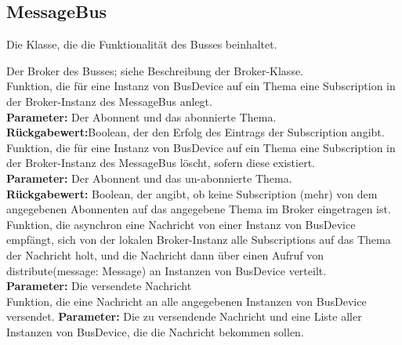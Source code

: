 \documentclass[entwurf.tex]{subfiles}
\begin{document}
	\subsection{MessageBus}
	\label{Class:MessageBus}
		Die Klasse, die die Funktionalität des Busses beinhaltet.
		\begin{description}
				Der Broker des Busses; siehe Beschreibung der Broker-Klasse. \\
				
			Funktion, die für eine Instanz von BusDevice auf ein Thema eine Subscription in der Broker-Instanz des MessageBus anlegt. \\
			\textbf{Parameter:} Der Abonnent und das abonnierte Thema. \\
			\textbf{Rückgabewert:}Boolean, der den Erfolg des Eintrags der Subscription angibt. \\
			
			Funktion, die für eine Instanz von BusDevice auf ein Thema eine Subscription in der Broker-Instanz des MessageBus löscht, sofern diese existiert. \\
			\textbf{Parameter:} Der Abonnent und das un-abonnierte Thema. \\
			\textbf{Rückgabewert:} Boolean, der angibt, ob keine Subscription (mehr) von dem angegebenen Abonnenten auf das angegebene Thema im Broker eingetragen ist. \\
			
			Funktion, die asynchron eine Nachricht von einer Instanz von BusDevice empfängt, sich von der lokalen Broker-Instanz alle Subscriptions auf das Thema der Nachricht holt, und die Nachricht dann über einen Aufruf von distribute(message: Message) an Instanzen von BusDevice verteilt. \\
			\textbf{Parameter:} Die versendete Nachricht \\
			
			Funktion, die eine Nachricht an alle angegebenen Instanzen von BusDevice versendet.
			\textbf{Parameter:} Die zu versendende Nachricht und eine Liste aller Instanzen von BusDevice, die die Nachricht bekommen sollen. \\
			\end{description}
			
\end{document}
